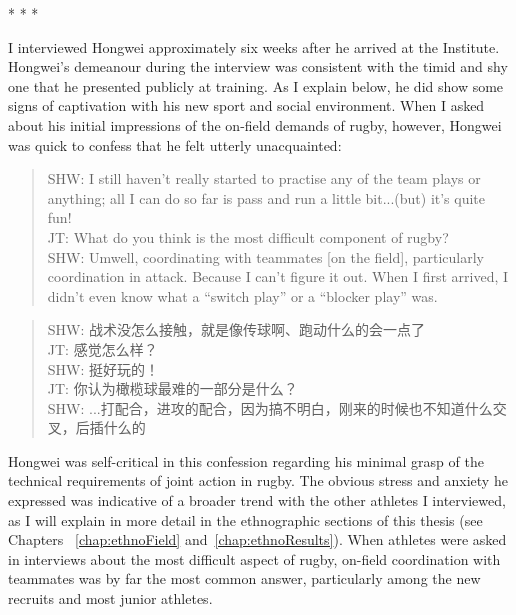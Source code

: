 \begin{CJK}{UTF8}{gbsn}
                            \begin{center}
                                * * *
                            \end{center}

I interviewed Hongwei approximately six weeks after he arrived at the Institute.  Hongwei's demeanour during the interview was consistent with the timid and shy one that he presented publicly at training.  As I explain below, he did show some signs of captivation with his new sport and social environment.  When I asked about his initial impressions of the on-field demands of rugby, however, Hongwei was quick to confess that he felt utterly unacquainted:

  \begin{quote}
    SHW: I still haven't really started to practise any of the team plays or anything; all I can do so far is pass and run a little bit...(but) it's quite fun! \\
    JT: What do you think is the most difficult component of rugby? \\
    SHW: Um\textellipsis well, coordinating with teammates [on the field], particularly coordination in attack.  Because I can't figure it out.  When I first arrived, I didn't even know what a ``switch play'' or a ``blocker play'' was.
  \end{quote}

  \begin{quote}
    SHW: 战术没怎么接触，就是像传球啊、跑动什么的会一点了 \\
    JT: 感觉怎么样？\\
    SHW: 挺好玩的！\\
    JT: 你认为橄榄球最难的一部分是什么？ \\
    SHW: ...打配合，进攻的配合，因为搞不明白，刚来的时候也不知道什么交叉，后插什么的 \\
  \end{quote}

Hongwei was self-critical in this confession regarding his minimal grasp of the technical requirements of joint action in rugby.  The obvious stress and anxiety he expressed was indicative of a broader trend with the other athletes I interviewed, as I will explain in more detail in the ethnographic sections of this thesis (see Chapters ~\ref{chap:ethnoField} and~\ref{chap:ethnoResults}). When athletes were asked in interviews about the most difficult aspect of rugby, on-field coordination with teammates was by far the most common answer, particularly among the new recruits and most junior athletes.


\end{CJK}
